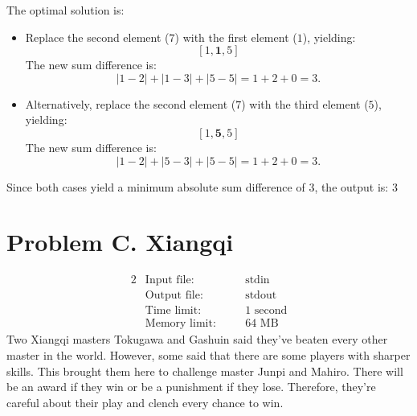 \documentclass[12pt,a4paper]{article}
\begin{document}
\noindent The optimal solution is:
\begin{itemize}
    \item Replace the second element ($7$) with the first element ($1$), yielding:
    \[
    [1, \mathbf{1}, 5]
    \]
    The new sum difference is:
    \[
    \left| 1 - 2 \right| + \left| 1 - 3 \right| + \left| 5 - 5 \right| = 1 + 2 + 0 = 3.
    \]
    
    \item Alternatively, replace the second element ($7$) with the third element ($5$), yielding:
    \[
    [1, \mathbf{5}, 5]
    \]
    The new sum difference is:
    \[
    \left| 1 - 2 \right| + \left| 5 - 3 \right| + \left| 5 - 5 \right| = 1 + 2 + 0 = 3.
    \]
\end{itemize}

\noindent Since both cases yield a minimum absolute sum difference of \( 3 \), the output is: $3$
\newpage

\section*{\fontsize{18}{12}Problem C. Xiangqi}

\begin{alignat*} {2}
 &   \text{Input file:}   \quad     &&\text{stdin}\\
 &   \text{Output file:}  \quad     &&\text{stdout}\\
 &   \text{Time limit:}   \quad     &&\text{1 second}\\
 &   \text{Memory limit:} \quad     &&\text{64 MB}
\end{alignat*}
\noindent
Two Xiangqi masters Tokugawa and Gashuin said they've beaten every other master in the world. However, some said that there
are some players with sharper skills. This brought them here
to challenge master Junpi and Mahiro. There will be an award if they win or be a punishment if they lose.
Therefore, they're careful about their play and clench every chance to win.
\end{document}
